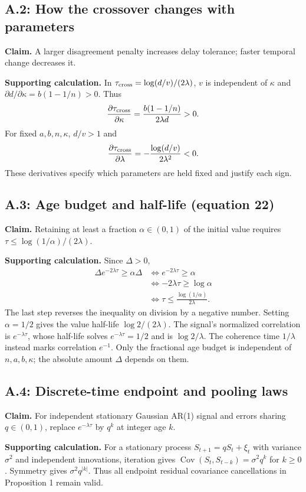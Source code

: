 \documentclass[12pt,letterpaper]{article}
\newcommand{\Cov}{\operatorname{Cov}}
\begin{document}
\subsection{A.2: How the crossover changes with parameters}
\textbf{Claim.} A larger disagreement penalty increases delay tolerance; faster temporal change decreases it.

\textbf{Supporting calculation.} In $\tau_{\rm cross}=\log(d/v)/(2\lambda)$, $v$ is independent of $\kappa$ and $\partial d/\partial\kappa=b(1-1/n)>0$. Thus
\[
\frac{\partial\tau_{\rm cross}}{\partial\kappa}
=\frac{b(1-1/n)}{2\lambda d}>0.
\]
For fixed $a,b,n,\kappa$, $d/v>1$ and
\[
\frac{\partial\tau_{\rm cross}}{\partial\lambda}
=-\frac{\log(d/v)}{2\lambda^2}<0.
\]
These derivatives specify which parameters are held fixed and justify each sign.

\subsection{A.3: Age budget and half-life (equation 22)}
\textbf{Claim.} Retaining at least a fraction $\alpha\in(0,1)$ of the initial value requires $\tau\le\log(1/\alpha)/(2\lambda)$.

\textbf{Supporting calculation.} Since $\Delta>0$,
\begin{align*}
\Delta e^{-2\lambda\tau}\ge\alpha\Delta
&\iff e^{-2\lambda\tau}\ge\alpha\\
&\iff -2\lambda\tau\ge\log\alpha\\
&\iff \tau\le\frac{\log(1/\alpha)}{2\lambda}.
\end{align*}
The last step reverses the inequality on division by a negative number. Setting $\alpha=1/2$ gives the value half-life $\log2/(2\lambda)$. The signal's normalized correlation is $e^{-\lambda\tau}$, whose half-life solves $e^{-\lambda\tau}=1/2$ and is $\log2/\lambda$. The coherence time $1/\lambda$ instead marks correlation $e^{-1}$. Only the fractional age budget is independent of $n,a,b,\kappa$; the absolute amount $\Delta$ depends on them.

\subsection{A.4: Discrete-time endpoint and pooling laws}
\textbf{Claim.} For independent stationary Gaussian AR(1) signal and errors sharing $q\in(0,1)$, replace $e^{-\lambda\tau}$ by $q^k$ at integer age $k$.

\textbf{Supporting calculation.} For a stationary process $S_{t+1}=qS_t+\xi_t$ with variance $\sigma^2$ and independent innovations, iteration gives $\Cov(S_t,S_{t-k})=\sigma^2q^k$ for $k\ge0$. Symmetry gives $\sigma^2q^{|k|}$. Thus all endpoint residual covariance cancellations in Proposition 1 remain valid.
\end{document}
